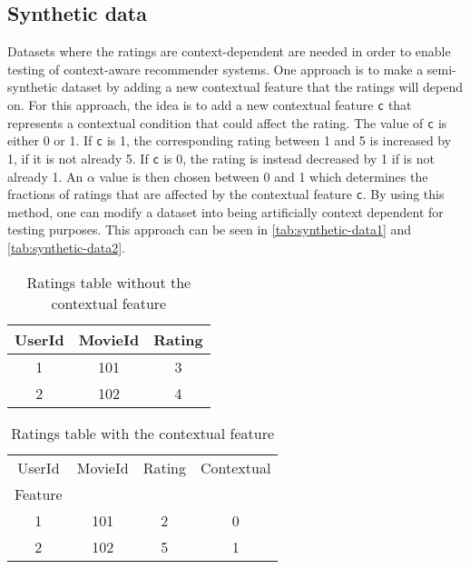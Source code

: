 \subsection{Synthetic data}
Datasets where the ratings are context-dependent are needed in order to enable testing of context-aware recommender systems.
One approach is to make a semi-synthetic dataset by adding a new contextual feature that the ratings will depend on\cite{baltrunasContextItemSplit}.
For this approach, the idea is to add a new contextual feature \texttt{c} that represents a contextual condition that could affect the rating.
The value of \texttt{c} is either 0 or 1. 
If \texttt{c} is 1, the corresponding rating between 1 and 5 is increased by 1, if it is not already 5.
If \texttt{c} is 0, the rating is instead decreased by 1 if is not already 1.
An $\alpha$ value is then chosen between 0 and 1 which determines the fractions of ratings that are affected by the contextual feature \texttt{c}.
By using this method, one can modify a dataset into being artificially context dependent for testing purposes.
This approach can be seen in \autoref{tab:synthetic-data1} and \autoref{tab:synthetic-data2}.
\begin{table*}[hbt!]
    \centering
    \begin{tabular}{|c|c|c|}
    \hline
    UserId & MovieId & Rating \\ [0.5ex] 
    \hline\hline
    1 & 101 & 3 \\
    \hline
    2 & 102 & 4 \\
    \hline
    \end{tabular}
    \caption{Ratings table without the contextual feature}
    \label{tab:synthetic-data1}
\end{table*}
\begin{table*}[hbt!]
    \centering
    \begin{tabular}{|c|c|c|c|} 
    \hline
    UserId & MovieId & Rating & Contextual\\Feature \\ [0.5ex] 
    \hline\hline
    1 & 101 & 2 & 0 \\
    \hline
    2 & 102 & 5 & 1 \\
    \hline
    \end{tabular}
    \caption{Ratings table with the contextual feature}
    \label{tab:synthetic-data2}
\end{table*}
